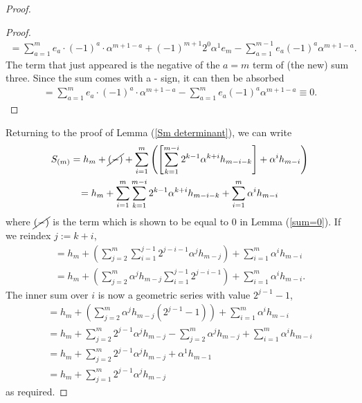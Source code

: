 \documentclass[10pt,a4paper]{amsart}
\begin{document}
\begin{proof}
\begin{proof}
\begin{gather*}
= \sum_{a=1}^me_a\cdot(-1)^a\cdot \alpha^{m+1-a}+(-1)^{m+1}2^0\alpha^{1}e_m -\sum_{a=1}^{m-1}e_{a}(-1)^a \alpha^{m+1-a}.
\end{gather*}
The term that just appeared is the negative of the $a=m$ term of (the new) sum three. Since the sum comes with a - sign, it can then be absorbed 
\begin{gather*}
= \sum_{a=1}^me_{a}\cdot(-1)^a\cdot \alpha^{m+1-a} -\sum_{a=1}^{m}e_{a}(-1)^a \alpha^{m+1-a} \equiv 0.
\end{gather*}
\end{proof}
Returning to the proof of Lemma (\ref{Sm determinant}), we can write 
\begin{gather*}
S_{(m)}=h_m +\cancel{(-)} + \sum_{i=1}^m\left(\left[\sum_{k=1}^{m-i}2^{k-1}\alpha^{k+i}h_{m-i-k}\right]+\alpha^ih_{m-i}\right)\\
=h_m +\sum_{i=1}^m\sum_{k=1}^{m-i}2^{k-1}\alpha^{k+i}h_{m-i-k}+\sum_{i=1}^m\alpha^ih_{m-i}
\end{gather*}
where $\cancel{(-)}$ is the term which is shown to be equal to 0 in Lemma (\ref{sum=0}). If we reindex $j:=k+i$, 
\begin{gather*}
=h_m + \left(\sum_{j=2}^m\sum_{i=1}^{j-1}2^{j-i-1}\alpha^jh_{m-j}\right)+\sum_{i=1}^m\alpha^ih_{m-i}\\
=h_m + \left(\sum_{j=2}^m\alpha^jh_{m-j}\sum_{i=1}^{j-1}2^{j-i-1}\right)+\sum_{i=1}^m\alpha^ih_{m-i}.
\end{gather*}
The inner sum over $i$ is now a geometric series with value $2^{j-1}-1$,
\begin{gather*}
=h_m + \left(\sum_{j=2}^m\alpha^jh_{m-j}(2^{j-1}-1)\right)+\sum_{i=1}^m\alpha^ih_{m-i}\\
=h_m + \sum_{j=2}^m2^{j-1}\alpha^jh_{m-j}-\sum_{j=2}^m\alpha^jh_{m-j}+\sum_{i=1}^m\alpha^ih_{m-i}\\
=h_m + \sum_{j=2}^m2^{j-1}\alpha^jh_{m-j}+\alpha^1h_{m-1}\\
=h_m + \sum_{j=1}^m2^{j-1}\alpha^jh_{m-j}
\end{gather*}
as required.
\end{proof}
\end{document}
